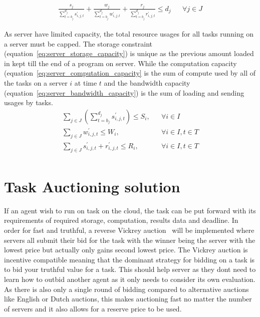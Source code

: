 \begin{align}
    \frac{s_j}{\sum^{d_j}_{t=b_j} s^{'}_{i,j,t}} + \frac{w_j}{\sum^{d_j}_{t=b_j} w^{'}_{i,j,t}}  +
    \frac{r_j}{\sum^{d_j}_{t=b_j} r^{'}_{i,j,t}} \leq d_j && \forall{j \in J}  \label{eq:deadline}
\end{align}

As server have limited capacity, the total resource usages for all tasks running on a server must be capped.
The storage constraint (equation~\eqref{eq:server_storage_capacity}) is unique as the previous amount
loaded in kept till the end of a program on server. While the computation capacity
(equation~\eqref{eq:server_computation_capacity} is the sum of compute used by all of the tasks on a server $i$ at time $t$ and the
bandwidth capacity (equation~\eqref{eq:server_bandwidth_capacity}) is the sum of loading and sending usages by tasks.
\begin{align}
    \sum_{j \in J} \left(\sum^{d_j}_{t=b_j} s^{'}_{i,j,t} \right) \leq S_i, && \forall{i \in I} \label{eq:server_storage_capacity} \\
    \sum_{j \in J} w^{'}_{i,j,t} \leq W_i, && \forall{i \in I, t \in T} \label{eq:server_computation_capacity} \\
    \sum_{j \in J} s^{'}_{i,j,t} + r^{'}_{i,j,t} \leq R_i, && \forall{i \in I, t \in T} \label{eq:server_bandwidth_capacity} \\
\end{align}

\section{Task Auctioning solution}\label{sec:task-auctioning}
If an agent wish to run on task on the cloud, the task can be put forward with its requirements of required storage,
computation, results data and deadline. In order for fast and truthful, a reverse Vickrey auction~\citep{vickrey}
will be implemented  where servers all submit their bid for the task with the winner being the server with the lowest
price but actually only gains second lowest price. The Vickrey auction is incentive compatible meaning that the dominant
strategy for bidding on a task is to bid your truthful value for a task. This should help server as they dont need
to learn how to outbid another agent as it only needs to consider its own evaluation.
As there is also only a single round of bidding compared to alternative auctions like English or Dutch
auctions, this makes auctioning fast no matter the number of servers and it also allows for a reserve price to be used.


